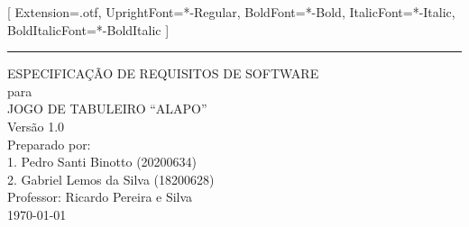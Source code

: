 \documentclass{scrreprt}
\date{\today}
\def\myversion{1.0}
\begin{document}
  \setmainfont{STIXTwoText}[
    Extension={.otf},
    UprightFont={*-Regular},
    BoldFont={*-Bold},
    ItalicFont={*-Italic},
    BoldItalicFont={*-BoldItalic}
  ]

  \begin{flushright}
      \rule{16cm}{5pt}\vskip1cm
      \begin{bfseries}
          \Huge{ESPECIFICAÇÃO DE REQUISITOS DE SOFTWARE}\\
          \vspace{1.0cm}
          para\\
          \vspace{1.0cm}
          JOGO DE TABULEIRO ``ALAPO''\\
          \vspace{1.0cm}
          \LARGE{Versão \myversion}\\
          \vspace{1.0cm}
          Preparado por: \\ 
          1. Pedro Santi Binotto (20200634)\\
          2. Gabriel Lemos da Silva (18200628)\\
          \vspace{1.0cm}
          Professor: Ricardo Pereira e Silva\\
          \vspace{1.0cm}
          \today\\
      \end{bfseries}
  \end{flushright}

  \tableofcontents

  \clearpage

  \printglossary[title=Lista de Definições, toctitle=Lista de Definições]

  
  
  

  
  
\end{document}
